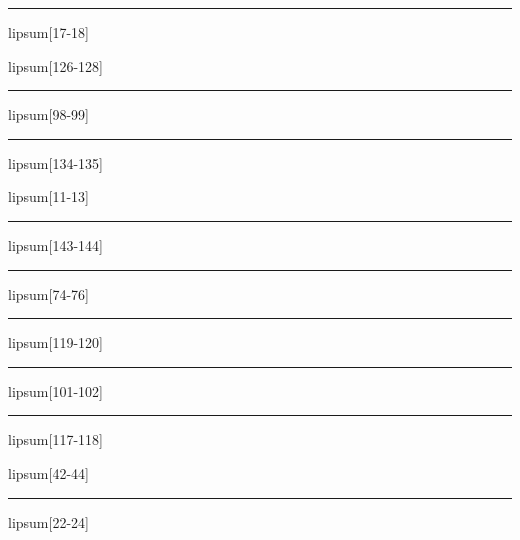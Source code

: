\documentclass[11pt,a4paper]{article}
\begin{document}
\begin{simplewrap}
  \textcolor{olive!24}{\rule{5.2cm}{9.9cm}}
\end{simplewrap}
lipsum[17-18]

lipsum[126-128]

\begin{simplewrap}
  \textcolor{brown!39}{\rule{5.7cm}{5.4cm}}
\end{simplewrap}
lipsum[98-99]

\begin{simplewrap}
  \textcolor{pink!49}{\rule{5.8cm}{6.6cm}}
\end{simplewrap}
lipsum[134-135]

lipsum[11-13]

\begin{simplewrap}
  \textcolor{magenta!43}{\rule{4.6cm}{9.9cm}}
\end{simplewrap}
lipsum[143-144]

\begin{simplewrap}
  \textcolor{blue!22}{\rule{3.9cm}{5.2cm}}
\end{simplewrap}
lipsum[74-76]

\begin{simplewrap}
  \textcolor{olive!28}{\rule{4.8cm}{2.4cm}}
\end{simplewrap}
lipsum[119-120]

\begin{simplewrap}
  \textcolor{blue!15}{\rule{5.2cm}{2.9cm}}
\end{simplewrap}
lipsum[101-102]

\begin{simplewrap}
  \textcolor{blue!11}{\rule{3.5cm}{6.7cm}}
\end{simplewrap}
lipsum[117-118]

lipsum[42-44]

\begin{simplewrap}
  \textcolor{orange!15}{\rule{3.3cm}{5.6cm}}
\end{simplewrap}
lipsum[22-24]
\end{document}
